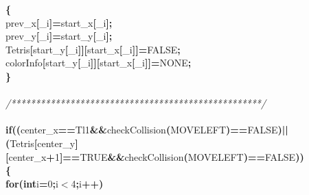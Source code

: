 \documentclass[a4paper, 10pt]{article}
\newcommand\SPC{\hspace*{0.6em}}
\newcommand\HYP{\mbox{\char 45}}
\newcommand{\CppAComment}[1]{\textit{\textcolor[rgb]{0.2,0.6,1}{#1}}}
\newcommand{\CppAIdentifier}[1]{#1}
\newcommand{\CppANumber}[1]{\textcolor[rgb]{0.5,0,0.5}{#1}}
\newcommand{\CppAReservedWord}[1]{\textbf{#1}}
\newcommand{\CppASpace}[1]{\colorbox[rgb]{1,1,1}{#1}}
\newcommand{\CppASymbol}[1]{\textbf{\textcolor[rgb]{1,0,0}{#1}}}
\begin{document}
\begin{ttfamily}
\CppASpace{\SPC \SPC \SPC \SPC }\CppASymbol{\{}\\
\CppASpace{\SPC \SPC \SPC \SPC \SPC }\CppAIdentifier{prev\_x}\CppASymbol{[}\CppAIdentifier{\_i}\CppASymbol{]}\CppASymbol{=}\CppAIdentifier{start\_x}\CppASymbol{[}\CppAIdentifier{\_i}\CppASymbol{]}\CppASymbol{;}\\
\CppASpace{\SPC \SPC \SPC \SPC \SPC }\CppAIdentifier{prev\_y}\CppASymbol{[}\CppAIdentifier{\_i}\CppASymbol{]}\CppASymbol{=}\CppAIdentifier{start\_y}\CppASymbol{[}\CppAIdentifier{\_i}\CppASymbol{]}\CppASymbol{;}\\
\CppASpace{\SPC \SPC \SPC \SPC \SPC }\CppAIdentifier{Tetris}\CppASymbol{[}\CppAIdentifier{start\_y}\CppASymbol{[}\CppAIdentifier{\_i}\CppASymbol{]}\CppASymbol{]}\CppASymbol{[}\CppAIdentifier{start\_x}\CppASymbol{[}\CppAIdentifier{\_i}\CppASymbol{]}\CppASymbol{]}\CppASymbol{=}\CppAIdentifier{FALSE}\CppASymbol{;}\\
\CppASpace{\SPC \SPC \SPC \SPC \SPC }\CppAIdentifier{colorInfo}\CppASymbol{[}\CppAIdentifier{start\_y}\CppASymbol{[}\CppAIdentifier{\_i}\CppASymbol{]}\CppASymbol{]}\CppASymbol{[}\CppAIdentifier{start\_x}\CppASymbol{[}\CppAIdentifier{\_i}\CppASymbol{]}\CppASymbol{]}\CppASymbol{=}\CppAIdentifier{NONE}\CppASymbol{;}\\
\CppASpace{\SPC \SPC \SPC \SPC }\CppASymbol{\}}\\
\\
\CppASpace{\SPC \SPC \SPC \SPC }\CppAComment{/***************************************************/}\\
\\
\CppASpace{\SPC \SPC \SPC \SPC }\CppAReservedWord{if}\CppASymbol{(}\CppASymbol{(}\CppAIdentifier{center\_x}\CppASymbol{==}\CppAIdentifier{Tl}\CppASymbol{\HYP }\CppANumber{1}\CppASpace{\SPC }\CppASymbol{\&\&}\CppASpace{\SPC }\CppAIdentifier{checkCollision}\CppASymbol{(}\CppAIdentifier{MOVELEFT}\CppASymbol{)}\CppASymbol{==}\CppAIdentifier{FALSE}\CppASymbol{)}\CppASpace{\SPC }\CppASymbol{||}\CppASpace{\SPC }\CppASymbol{(}\CppAIdentifier{Tetris}\CppASymbol{[}\CppAIdentifier{center\_y}\CppASymbol{]}\CppASymbol{[}\CppAIdentifier{center\_x}\CppASymbol{+}\CppANumber{1}\CppASymbol{]}\CppASymbol{==}\CppAIdentifier{TRUE}\CppASymbol{\&\&}\CppAIdentifier{checkCollision}\CppASymbol{(}\CppAIdentifier{MOVELEFT}\CppASymbol{)}\CppASymbol{==}\CppAIdentifier{FALSE}\CppASymbol{)}\CppASymbol{)}\\
\CppASpace{\SPC \SPC \SPC \SPC }\CppASymbol{\{}\\
\CppASpace{\SPC \SPC \SPC \SPC \SPC }\CppAReservedWord{for}\CppASymbol{(}\CppAReservedWord{int}\CppASpace{\SPC }\CppAIdentifier{i}\CppASymbol{=}\CppANumber{0}\CppASymbol{;}\CppAIdentifier{i}\CppASymbol{$<$}\CppANumber{4}\CppASymbol{;}\CppAIdentifier{i}\CppASymbol{++}\CppASymbol{)}\\

\end{ttfamily}
\end{document}
